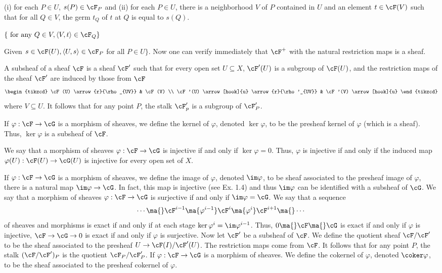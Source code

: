 (i) for each $P \in U$, $s(P) \in \cF_P$ and
(ii) for each $P \in U$, there is a neighborhood $V$ of $P$ contained in $U$ and an element $t \in \cF(V)$ such that for all $Q \in V$, the germ $t_Q$ of $t$ at $Q$ is equal to $s(Q)$.

$\{ \text{ for any } Q \in V, \langle V,t \rangle \in \cF_Q \}$

Given $s \in \cF(U), \langle U,s \rangle \in \cF_P$ for all $P \in U\}$. Now one can verify immediately that $\cF^+$ with the natural restriction maps is a sheaf. 




\begin{dfn}
A subsheaf of a sheaf $\cF$ is a sheaf $\cF'$ such that for every open set $U \subseteq X$, $\cF'(U)$ is a subgroup of $\cF(U)$, and the restriction maps of the sheaf $\cF'$ are induced by those from $\cF$
	\[
	\begin{tikzcd}
	\cF(U) \arrow{r}{\rho_{UV}} & \cF(V) \\
	\cF'(U) \arrow[hook]{u} \arrow{r}{\rho'_{UV}} & \cF'(V) \arrow[hook]{u}
	\end{tikzcd}
	\]
where $V \subseteq U$.  It follows that for any point $P$, the stalk $\cF'_p$ is a subgroup of $\cF'_P$.

If $\varphi: \cF \to \cG$ is a morphism of sheaves, we define the kernel of  $\varphi$, denoted $\ker \varphi$, to be the presheaf kernel of $\varphi$ (which is a sheaf). Thus, $\ker \varphi$ is a subsheaf of $\cF$. 

We say that a morphism of sheaves $\varphi: \cF \to \cG$ is injective if and only if $\ker \varphi= 0$. Thus, $\varphi$ is injective if and only if the induced map $\varphi(U): \cF(U) \to \cG(U)$ is injective for every open set of $X$.

If $\varphi: \cF \to \cG$ is a morphism of sheaves, we define the image of $\varphi$, denoted $\im \varphi$, to be sheaf associated to the presheaf image of $\varphi$, there is a natural map $\im \varphi \to \cG$. In fact, this map is injective (see Ex. 1.4) and thus $\im \varphi$ can be identified with a subsheaf of $\cG$. We say that a morphism of sheaves $\varphi: \cF \to \cG$ is surjective if and only if $\im \varphi= \cG$. We say that a sequence
	\[
	\cdots \ma{} \cF^{i-1} \ma{\varphi^{i-1}} \cF^i \ma{\varphi^i} \cF^{i+1} \ma{} \cdots
	\]
of sheaves and morphisms is exact if and only if at each stage $\ker \varphi^i= \im \varphi^{i-1}$. Thus, $0 \ma{} \cF \ma{} \cG$ is exact if and only if $\varphi$ is injective, $\cF \to \cG \to 0$ is exact if and only if $\varphi$ is surjective. Now let $\cF'$ be a subsheaf of $\cF$. We define the quotient sheaf $\cF/\cF'$ to be the sheaf associated to the presheaf $U \to \cF(I)/\cF'(U)$. The restriction maps come from $\cF$. It follows that for any point $P$, the stalk $(\cF/\cF')_P$ is the quotient $\cF_P/\cF_P'$. If $\varphi: \cF \to \cG$ is a morphism of sheaves. We define the cokernel of $\varphi$, denoted $\coker \varphi$, to be the sheaf associated to the presheaf cokernel of $\varphi$. 
\end{dfn}




